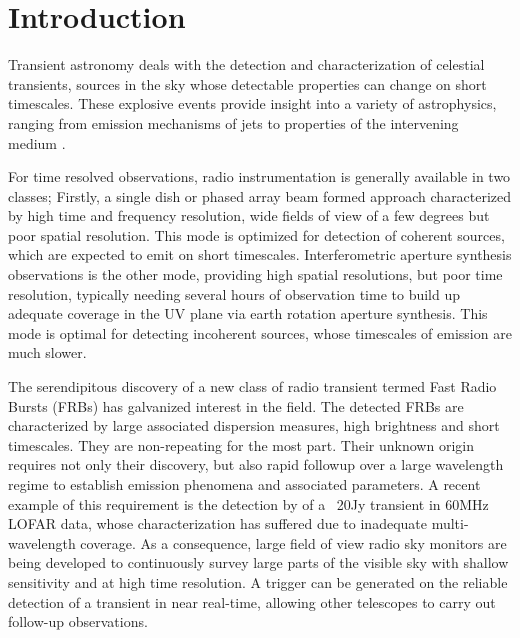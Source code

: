 \documentclass{ws-jai}
\begin{document}
\section{\label{sec:Introduction}Introduction}

\noindent Transient astronomy  deals with the detection  and characterization of
celestial transients, sources in the  sky whose detectable properties can change
on short timescales.   These explosive events provide insight into  a variety of
astrophysics,  ranging from  emission mechanisms  of jets  to properties  of the
intervening  medium \citep{fender2006lofar,lazio2009dynamic}.  


For time resolved observations, radio  instrumentation is generally available in
two  classes; Firstly,  a  single  dish or  phased  array  beam formed  approach
characterized by  high time and frequency  resolution, wide fields of  view of a
few degrees but poor spatial resolution. This mode is optimized for detection of
coherent    sources,     which    are     expected    to    emit     on    short
timescales. Interferometric  aperture synthesis observations is  the other mode,
providing high spatial resolutions, but  poor time resolution, typically needing
several hours of observation time to build  up adequate coverage in the UV plane
via  earth rotation  aperture synthesis.   This  mode is  optimal for  detecting
incoherent  sources,  whose  timescales  of   emission  are  much  slower.

The serendipitous discovery of a new  class of radio transient termed Fast Radio
Bursts  (FRBs)\citep{spitler2015fast,   thornton2013population}  has  galvanized
interest in the field.  The detected  FRBs are characterized by large associated
dispersion   measures,  high   brightness  and   short  timescales.    They  are
non-repeating for  the most part. Their  unknown origin requires not  only their
discovery, but also  rapid followup over a large wavelength  regime to establish
emission  phenomena  and  associated  parameters.   A  recent  example  of  this
requirement is the detection by \citet{stewart2016lofar} of a ~20Jy transient in
60MHz  LOFAR  data,  whose  characterization  has  suffered  due  to  inadequate
multi-wavelength  coverage. As  a consequence,  large  field of  view radio  sky
monitors are being  developed to continuously survey large parts  of the visible
sky  with shallow  sensitivity and  at high  time resolution.  A trigger  can be
generated on the  reliable detection of a transient in  near real-time, allowing
other telescopes to carry out follow-up observations.
\end{document}
